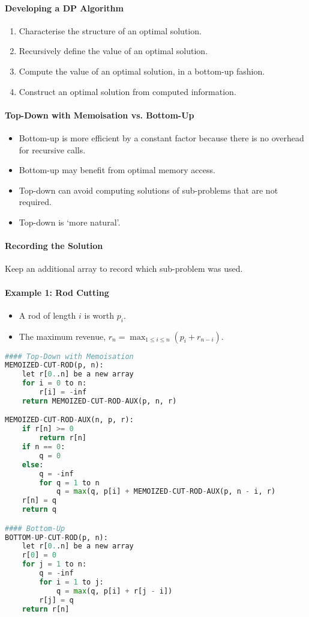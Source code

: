 \documentclass[twocolumn,english]{article}
\numberwithin{equation}{section}
\numberwithin{figure}{section}
\numberwithin{table}{section}
\begin{document}
\paragraph{Developing a DP Algorithm}
\begin{enumerate}
\item Characterise the structure of an optimal solution.
\item Recursively define the value of an optimal solution.
\item Compute the value of an optimal solution, in a bottom-up fashion.
\item Construct an optimal solution from computed information.
\end{enumerate}

\paragraph{Top-Down with Memoisation vs. Bottom-Up}
\begin{itemize}
\item Bottom-up is more efficient by a constant factor because there is
no overhead for recursive calls.
\item Bottom-up may benefit from optimal memory access.
\item Top-down can avoid computing solutions of sub-problems that are not
required.
\item Top-down is `more natural'.
\end{itemize}

\paragraph{Recording the Solution}

Keep an additional array to record which sub-problem was used.

\paragraph{Example 1: Rod Cutting}
\begin{itemize}
\item A rod of length $i$ is worth $p_{i}$.
\item The maximum revenue, $r_{n}=\max_{1\leq i\leq n}\left(p_{i}+r_{n-i}\right)$.
\end{itemize}
\begin{lstlisting}[language=Python,basicstyle={\footnotesize\ttfamily},tabsize=4,frame=single]
#### Top-Down with Memoisation
MEMOIZED-CUT-ROD(p, n):
	let r[0..n] be a new array
	for i = 0 to n:
		r[i] = -inf
	return MEMOIZED-CUT-ROD-AUX(p, n, r)

MEMOIZED-CUT-ROD-AUX(n, p, r):
	if r[n] >= 0
		return r[n]
	if n == 0:
		q = 0
	else:
		q = -inf
		for q = 1 to n
			q = max(q, p[i] + MEMOIZED-CUT-ROD-AUX(p, n - i, r)
	r[n] = q
	return q

#### Bottom-Up
BOTTOM-UP-CUT-ROD(p, n):
	let r[0..n] be a new array
	r[0] = 0
	for j = 1 to n:
		q = -inf
		for i = 1 to j:
			q = max(q, p[i] + r[j - i])
		r[j] = q
	return r[n]
\end{lstlisting}
\end{document}
